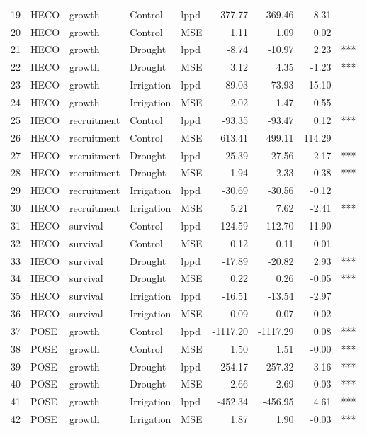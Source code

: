 \documentclass[11pt]{article}
\begin{document}
\begin{longtable}{rllllrrrl}
	19 & HECO & growth & Control & lppd & -377.77 & -369.46 & -8.31 &  \\ 
	20 & HECO & growth & Control & MSE & 1.11 & 1.09 & 0.02 &  \\ 
	21 & HECO & growth & Drought & lppd & -8.74 & -10.97 & 2.23 & *** \\ 
	22 & HECO & growth & Drought & MSE & 3.12 & 4.35 & -1.23 & *** \\ 
	23 & HECO & growth & Irrigation & lppd & -89.03 & -73.93 & -15.10 &  \\ 
	24 & HECO & growth & Irrigation & MSE & 2.02 & 1.47 & 0.55 &  \\ 
	25 & HECO & recruitment & Control & lppd & -93.35 & -93.47 & 0.12 & *** \\ 
	26 & HECO & recruitment & Control & MSE & 613.41 & 499.11 & 114.29 &  \\ 
	27 & HECO & recruitment & Drought & lppd & -25.39 & -27.56 & 2.17 & *** \\ 
	28 & HECO & recruitment & Drought & MSE & 1.94 & 2.33 & -0.38 & *** \\ 
	29 & HECO & recruitment & Irrigation & lppd & -30.69 & -30.56 & -0.12 &  \\ 
	30 & HECO & recruitment & Irrigation & MSE & 5.21 & 7.62 & -2.41 & *** \\ 
	31 & HECO & survival & Control & lppd & -124.59 & -112.70 & -11.90 &  \\ 
	32 & HECO & survival & Control & MSE & 0.12 & 0.11 & 0.01 &  \\ 
	33 & HECO & survival & Drought & lppd & -17.89 & -20.82 & 2.93 & *** \\ 
	34 & HECO & survival & Drought & MSE & 0.22 & 0.26 & -0.05 & *** \\ 
	35 & HECO & survival & Irrigation & lppd & -16.51 & -13.54 & -2.97 &  \\ 
	36 & HECO & survival & Irrigation & MSE & 0.09 & 0.07 & 0.02 &  \\ 
	37 & POSE & growth & Control & lppd & -1117.20 & -1117.29 & 0.08 & *** \\ 
	38 & POSE & growth & Control & MSE & 1.50 & 1.51 & -0.00 & *** \\ 
	39 & POSE & growth & Drought & lppd & -254.17 & -257.32 & 3.16 & *** \\ 
	40 & POSE & growth & Drought & MSE & 2.66 & 2.69 & -0.03 & *** \\ 
	41 & POSE & growth & Irrigation & lppd & -452.34 & -456.95 & 4.61 & *** \\ 
	42 & POSE & growth & Irrigation & MSE & 1.87 & 1.90 & -0.03 & *** \\ 

\end{longtable}
\end{document}
